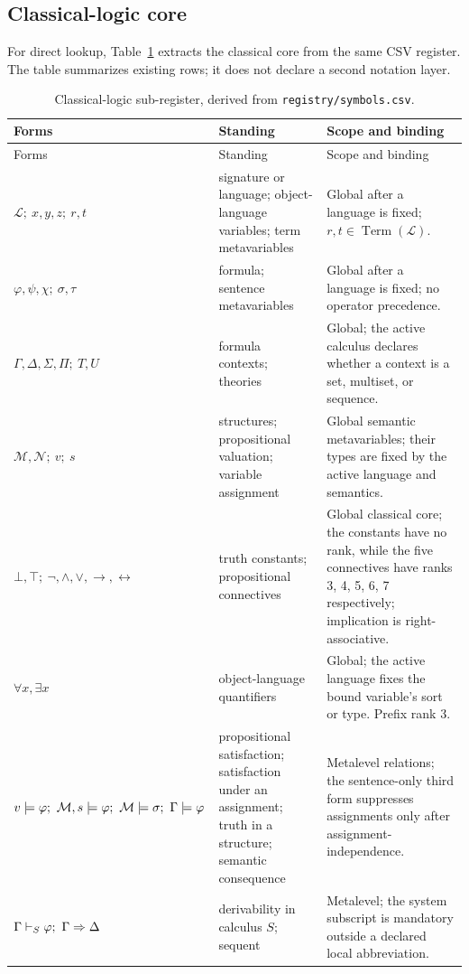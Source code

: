 

\subsection{Classical-logic core}
\label{sec:p01-classical-symbols}

For direct lookup, Table~\ref{tab:p01-classical-symbols} extracts the
classical core from the same CSV register.  The table summarizes
existing rows; it does not declare a second notation layer.

\begingroup\small
\begin{longtable}{@{}p{}p{}p{}@{}}
\caption{Classical-logic sub-register, derived from
\texttt{registry/symbols.csv}.}
\label{tab:p01-classical-symbols}\\
\toprule
Forms & Standing & Scope and binding \\
\midrule
\endfirsthead
\toprule
Forms & Standing & Scope and binding \\
\midrule
\endhead
\(\mathcal L;\ x,y,z;\ r,t\) & signature or language;
object-language variables; term metavariables & Global after a language is
fixed; \(r,t\in\operatorname{Term}(\mathcal L)\). \\
\(\varphi,\psi,\chi;\ \sigma,\tau\) & formula; sentence metavariables &
Global after a language is fixed; no operator precedence. \\
\(\Gamma,\Delta,\Sigma,\Pi;\ T,U\) & formula contexts; theories &
Global; the active calculus declares whether a context is a set, multiset,
or sequence. \\
\(\mathcal M,\mathcal N;\ v;\ s\) & structures; propositional valuation;
variable assignment & Global semantic metavariables; their types are fixed
by the active language and semantics. \\
\(\bot,\top;\ \neg,\land,\lor,\to,\leftrightarrow\) & truth constants;
propositional connectives & Global classical core; the constants have no
rank, while the five connectives have ranks 3, 4, 5, 6, 7 respectively;
implication is right-associative. \\
\(\forall x,\exists x\) & object-language quantifiers & Global; the active
language fixes the bound variable's sort or type.  Prefix rank 3. \\
\(v\models\varphi;\ \mathcal M,s\models\varphi;
\ \mathcal M\models\sigma;\ \Gamma\models\varphi\) & propositional
satisfaction; satisfaction under an assignment; truth in a structure;
semantic consequence & Metalevel relations; the sentence-only third form
suppresses assignments only after assignment-independence. \\
\(\Gamma\derives_{S}\varphi;\ \Gamma\Rightarrow\Delta\) & derivability in
calculus \(S\); sequent & Metalevel; the system subscript is mandatory
outside a declared local abbreviation. \\
\bottomrule
\end{longtable}
\endgroup

